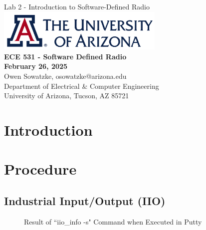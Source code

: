 \documentclass{article}
\begin{document}
\begin{titlepage}
	\centering
	{\huge Lab 2 - Introduction to Software-Defined Radio}\\[0.25 in]
	\includegraphics[width=0.6\textwidth]{ua_logo.png}\\[0.25 in]
	{\large \textbf{ECE 531 - Software Defined Radio\\[0.25 in]
	February 26, 2025\\[0.25 in]}}
	{\large Owen Sowatzke, osowatzke@arizona.edu\\[0.05 in]
	Department of Electrical \& Computer Engineering\\[0.05 in]
	University of Arizona, Tucson, AZ 85721\\[0.5 in]}
	\hypersetup{linkcolor=navy-blue}
	\noindent\hrulefill
	\tableofcontents
	\noindent\hrulefill
\end{titlepage}

\setlength{\parindent}{0pt}

\section{Introduction}

\section{Procedure}

\subsection{Industrial Input/Output (IIO)}
\label{subsection::industrial_input_output}

\begin{figure}[H]
	\centerline{}
	\caption{Result of ``iio\_info -s" Command when Executed in Putty}
	\label{fig::iio_info_putty}
\end{figure}
\end{document}
